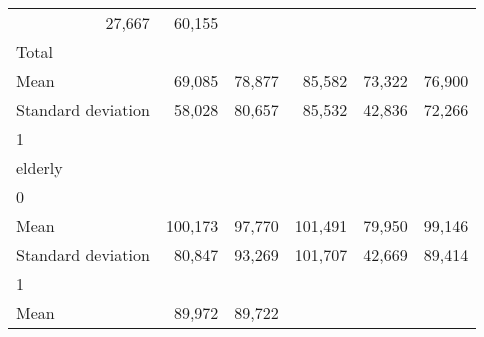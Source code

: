 \begin{tabular}{llllll}
  \multicolumn{1}{r}{27,667} &
  \multicolumn{1}{r}{60,155} \\
\multicolumn{1}{l}{\hspace{3em}Total} &
  \multicolumn{1}{|r}{} &
  \multicolumn{1}{r}{} &
  \multicolumn{1}{r}{} &
  \multicolumn{1}{r}{} &
  \multicolumn{1}{r}{} \\
\multicolumn{1}{l}{\hspace{4em}Mean} &
  \multicolumn{1}{|r}{69,085} &
  \multicolumn{1}{r}{78,877} &
  \multicolumn{1}{r}{85,582} &
  \multicolumn{1}{r}{73,322} &
  \multicolumn{1}{r}{76,900} \\
\multicolumn{1}{l}{\hspace{4em}Standard deviation} &
  \multicolumn{1}{|r}{58,028} &
  \multicolumn{1}{r}{80,657} &
  \multicolumn{1}{r}{85,532} &
  \multicolumn{1}{r}{42,836} &
  \multicolumn{1}{r}{72,266} \\
\multicolumn{1}{l}{\hspace{1em}1} &
  \multicolumn{1}{|r}{} &
  \multicolumn{1}{r}{} &
  \multicolumn{1}{r}{} &
  \multicolumn{1}{r}{} &
  \multicolumn{1}{r}{} \\
\multicolumn{1}{l}{\hspace{2em}elderly} &
  \multicolumn{1}{|r}{} &
  \multicolumn{1}{r}{} &
  \multicolumn{1}{r}{} &
  \multicolumn{1}{r}{} &
  \multicolumn{1}{r}{} \\
\multicolumn{1}{l}{\hspace{3em}0} &
  \multicolumn{1}{|r}{} &
  \multicolumn{1}{r}{} &
  \multicolumn{1}{r}{} &
  \multicolumn{1}{r}{} &
  \multicolumn{1}{r}{} \\
\multicolumn{1}{l}{\hspace{4em}Mean} &
  \multicolumn{1}{|r}{100,173} &
  \multicolumn{1}{r}{97,770} &
  \multicolumn{1}{r}{101,491} &
  \multicolumn{1}{r}{79,950} &
  \multicolumn{1}{r}{99,146} \\
\multicolumn{1}{l}{\hspace{4em}Standard deviation} &
  \multicolumn{1}{|r}{80,847} &
  \multicolumn{1}{r}{93,269} &
  \multicolumn{1}{r}{101,707} &
  \multicolumn{1}{r}{42,669} &
  \multicolumn{1}{r}{89,414} \\
\multicolumn{1}{l}{\hspace{3em}1} &
  \multicolumn{1}{|r}{} &
  \multicolumn{1}{r}{} &
  \multicolumn{1}{r}{} &
  \multicolumn{1}{r}{} &
  \multicolumn{1}{r}{} \\
\multicolumn{1}{l}{\hspace{4em}Mean} &
  \multicolumn{1}{|r}{89,972} &
  \multicolumn{1}{r}{89,722} &

\end{tabular}
